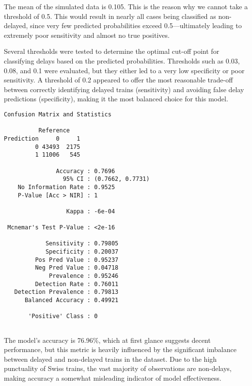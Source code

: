 \documentclass[
]{article}
\begin{document}
The mean of the simulated data is 0.105. This is the reason why we
cannot take a threshold of 0.5. This would result in nearly all cases
being classified as non-delayed, since very few predicted probabilities
exceed 0.5---ultimately leading to extremely poor sensitivity and almost
no true positives.

Several thresholds were tested to determine the optimal cut-off point
for classifying delays based on the predicted probabilities. Thresholds
such as 0.03, 0.08, and 0.1 were evaluated, but they either led to a
very low specificity or poor sensitivity. A threshold of 0.2 appeared to
offer the most reasonable trade-off between correctly identifying
delayed trains (sensitivity) and avoiding false delay predictions
(specificity), making it the most balanced choice for this model.

\begin{verbatim}
Confusion Matrix and Statistics

          Reference
Prediction     0     1
         0 43493  2175
         1 11006   545
                                          
               Accuracy : 0.7696          
                 95% CI : (0.7662, 0.7731)
    No Information Rate : 0.9525          
    P-Value [Acc > NIR] : 1               
                                          
                  Kappa : -6e-04          
                                          
 Mcnemar's Test P-Value : <2e-16          
                                          
            Sensitivity : 0.79805         
            Specificity : 0.20037         
         Pos Pred Value : 0.95237         
         Neg Pred Value : 0.04718         
             Prevalence : 0.95246         
         Detection Rate : 0.76011         
   Detection Prevalence : 0.79813         
      Balanced Accuracy : 0.49921         
                                          
       'Positive' Class : 0               
                                          
\end{verbatim}

The model's accuracy is 76.96\%, which at first glance suggests decent
performance, but this metric is heavily influenced by the significant
imbalance between delayed and non-delayed trains in the dataset. Due to
the high punctuality of Swiss trains, the vast majority of observations
are non-delays, making accuracy a somewhat misleading indicator of model
effectiveness.
\end{document}
